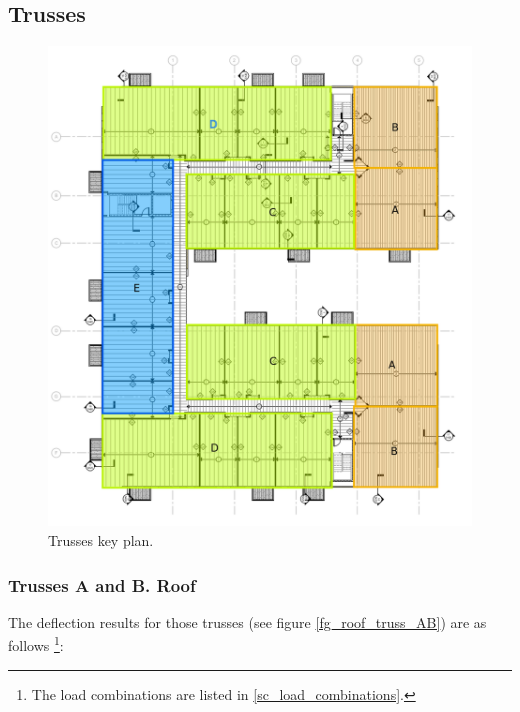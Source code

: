 \subsection{Trusses}

\begin{figure}
  \begin{center}
  \includegraphics[width=120mm]{figures/3rd_floor_truss_key_plan}
  \end{center}
  \caption{Trusses key plan.}\label{fg_3rd_floor_truss_key_plan}
\end{figure}

\subsubsection{Trusses A and B. Roof}
The deflection results for those trusses (see figure \ref{fg_roof_truss_AB}) are as follows \footnote{The load combinations are listed in \ref{sc_load_combinations}.}:

